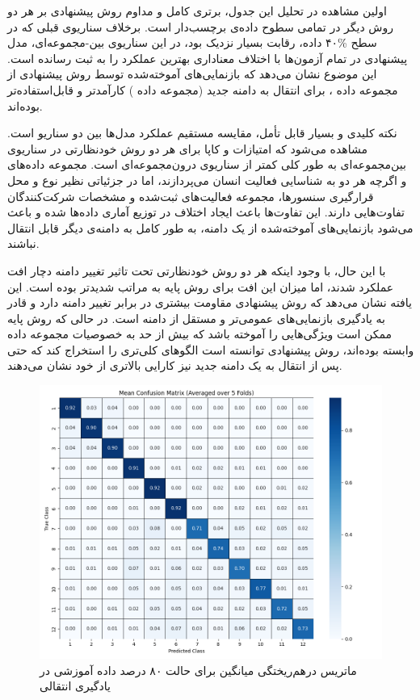 اولین مشاهده در تحلیل این جدول، برتری کامل و مداوم روش پیشنهادی بر هر دو روش دیگر در تمامی سطوح داده‌ی برچسب‌دار است. برخلاف سناریوی قبلی که در سطح \%۴۰ داده، رقابت بسیار نزدیک بود، در این سناریوی بین-مجموعه‌ای، مدل پیشنهادی در تمام آزمون‌ها با اختلاف معناداری بهترین عملکرد را به ثبت رسانده است. این موضوع نشان می‌دهد که بازنمایی‌های آموخته‌شده توسط روش پیشنهادی از مجموعه داده ، برای انتقال به دامنه جدید (مجموعه داده ) کارآمدتر و قابل‌استفاده‌تر بوده‌اند.

نکته کلیدی و بسیار قابل تأمل، مقایسه مستقیم عملکرد مدل‌ها بین دو سناریو است. مشاهده می‌شود که امتیازات  و کاپا برای هر دو روش خودنظارتی در سناریوی بین‌مجموعه‌ای به طور کلی کمتر از سناریوی درون‌مجموعه‌ای است. مجموعه داده‌های  و  اگرچه هر دو به شناسایی فعالیت انسان می‌پردازند، اما در جزئیاتی نظیر
نوع و محل قرارگیری سنسورها، مجموعه فعالیت‌های ثبت‌شده و مشخصات شرکت‌کنندگان تفاوت‌هایی دارند. این تفاوت‌ها باعث ایجاد اختلاف در توزیع آماری داده‌ها شده و باعث می‌شود بازنمایی‌های آموخته‌شده از یک دامنه، به طور کامل به دامنه‌ی دیگر قابل انتقال نباشند.

با این حال، با وجود اینکه هر دو روش خودنظارتی تحت تاثیر تغییر دامنه دچار افت عملکرد شدند، اما میزان این افت برای روش پایه به مراتب شدیدتر بوده است. این یافته نشان می‌دهد که روش پیشنهادی مقاومت بیشتری در برابر تغییر دامنه دارد و قادر به یادگیری بازنمایی‌های عمومی‌تر و مستقل از دامنه است. در حالی که روش پایه ممکن است ویژگی‌هایی را آموخته باشد که بیش از حد به خصوصیات مجموعه داده  وابسته بوده‌اند، روش پیشنهادی توانسته است الگوهای کلی‌تری را استخراج کند که حتی پس از انتقال به یک دامنه جدید نیز کارایی بالاتری از خود نشان می‌دهند.

\begin{figure}[htb!]
  \centering
  \includegraphics[width=1\textwidth]{Images/Chapter4/confusion-transfer.png}
  \caption{ماتریس درهم‌ریختگی میانگین برای حالت ۸۰ درصد داده آموزشی در یادگیری انتقالی}
  \label{fig:confusion-transfer}
\end{figure}

